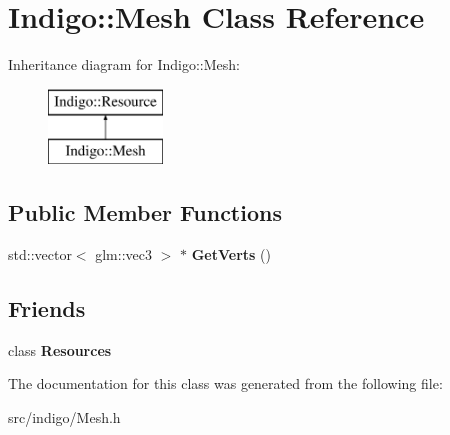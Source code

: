 \hypertarget{class_indigo_1_1_mesh}{}\section{Indigo\+:\+:Mesh Class Reference}
\label{class_indigo_1_1_mesh}
Inheritance diagram for Indigo\+:\+:Mesh\+:\begin{figure}[H]
\begin{center}
\leavevmode
\includegraphics[height=2.000000cm]{class_indigo_1_1_mesh}
\end{center}
\end{figure}
\subsection*{Public Member Functions}
\begin{DoxyCompactItemize}
\item 
\mbox{\label{class_indigo_1_1_mesh_a7cd5f7a30e82650d9698a1aa726d2c94}} 
std\+::vector$<$ glm\+::vec3 $>$ $\ast$ {\bfseries Get\+Verts} ()
\end{DoxyCompactItemize}
\subsection*{Friends}
\begin{DoxyCompactItemize}
\item 
\mbox{\label{class_indigo_1_1_mesh_a74b3f77e4a7285c624d30192f9643876}} 
class {\bfseries Resources}
\end{DoxyCompactItemize}


The documentation for this class was generated from the following file\+:\begin{DoxyCompactItemize}
\item 
src/indigo/Mesh.\+h\end{DoxyCompactItemize}
